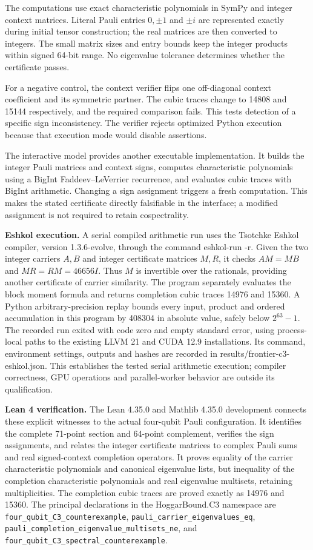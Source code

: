 \documentclass[11pt,letterpaper]{article}
\begin{document}
The computations use exact characteristic polynomials in SymPy and integer context matrices. Literal Pauli entries \(0,\pm1\) and \(\pm i\) are represented exactly during initial tensor construction; the real matrices are then converted to integers. The small matrix sizes and entry bounds keep the integer products within signed 64-bit range. No eigenvalue tolerance determines whether the certificate passes.

For a negative control, the context verifier flips one off-diagonal context coefficient and its symmetric partner. The cubic traces change to 14808 and 15144 respectively, and the required comparison fails. This tests detection of a specific sign inconsistency. The verifier rejects optimized Python execution because that execution mode would disable assertions.

The interactive model provides another executable implementation. It builds the integer Pauli matrices and context signs, computes characteristic polynomials using a BigInt Faddeev--LeVerrier recurrence, and evaluates cubic traces with BigInt arithmetic. Changing a sign assignment triggers a fresh computation. This makes the stated certificate directly falsifiable in the interface; a modified assignment is not required to retain cospectrality.

\textbf{Eshkol execution.} A serial compiled arithmetic run uses the Tsotchke Eshkol compiler, version 1.3.6-evolve, through the command eshkol-run -r. Given the two integer carriers \(A,B\) and integer certificate matrices \(M,R\), it checks \(AM=MB\) and \(MR=RM=46656I\). Thus \(M\) is invertible over the rationals, providing another certificate of carrier similarity. The program separately evaluates the block moment formula and returns completion cubic traces 14976 and 15360. A Python arbitrary-precision replay bounds every input, product and ordered accumulation in this program by 408304 in absolute value, safely below \(2^{63}-1\). The recorded run exited with code zero and empty standard error, using process-local paths to the existing LLVM 21 and CUDA 12.9 installations. Its command, environment settings, outputs and hashes are recorded in results/frontier-c3-eshkol.json. This establishes the tested serial arithmetic execution; compiler correctness, GPU operations and parallel-worker behavior are outside its qualification.

\textbf{Lean 4 verification.} The Lean 4.35.0 and Mathlib 4.35.0 development connects these explicit witnesses to the actual four-qubit Pauli configuration. It identifies the complete 71-point section and 64-point complement, verifies the sign assignments, and relates the integer certificate matrices to complex Pauli sums and real signed-context completion operators. It proves equality of the carrier characteristic polynomials and canonical eigenvalue lists, but inequality of the completion characteristic polynomials and real eigenvalue multisets, retaining multiplicities. The completion cubic traces are proved exactly as 14976 and 15360. The principal declarations in the HoggarBound.C3 namespace are \texttt{four\_qubit\_C3\_counterexample}, \texttt{pauli\_carrier\_eigenvalues\_eq}, \texttt{pauli\_completion\_eigenvalue\_multisets\_ne}, and \texttt{four\_qubit\_C3\_spectral\_counterexample}.
\end{document}
